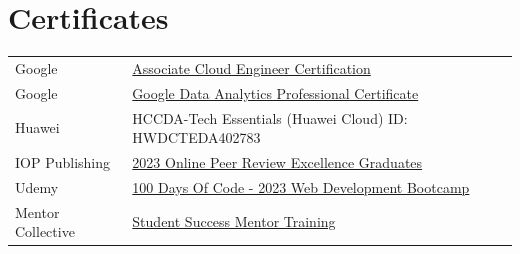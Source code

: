 \documentclass[letterpaper,10pt]{article}
\begin{document}
\section{Certificates}
\begin{tabularx}{\linewidth}{@{}l X@{}}	
Google & \href{https://www.credly.com/badges/a4cdb365-cfea-4db6-8d95-9f6d1f68c9ca/linked_in_profile}{Associate Cloud Engineer Certification
}\\
Google & \href{https://www.credly.com/go/FHkiolee}{Google Data Analytics Professional Certificate
}\\
Huawei & HCCDA-Tech Essentials (Huawei Cloud) ID: HWDCTEDA402783\\
IOP Publishing  & \href{https://accreditations.ioppublishing.org/765801b1-b885-4afd-89ec-aade957ed829}{2023 Online Peer Review Excellence Graduates} \\
Udemy & \href{https://www.udemy.com/certificate/UC-a5029241-69d1-4048-b625-9799ae9f94bc/}{100 Days Of Code - 2023 Web Development Bootcamp}\\
Mentor Collective & \href{https://learning.mentorcollective.org/certificates/3lybn4oz10}{Student Success Mentor Training}\\
\end{tabularx}
\end{document}
